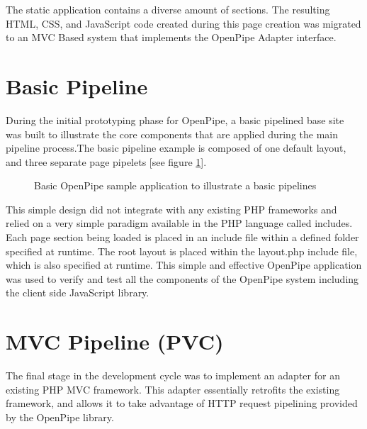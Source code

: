 \documentclass[12pt]{report}
\begin{document}
The static application contains a diverse amount of sections. The resulting HTML, CSS, and JavaScript code created during this page creation was migrated to an MVC Based system that implements the OpenPipe Adapter interface.


\section{Basic Pipeline}
During the initial prototyping phase for OpenPipe, a basic pipelined base site was built to illustrate the core components that are applied during the main pipeline process.The basic pipeline example is composed of one default layout, and three separate page pipelets [see figure \ref{fig:basicPipeline}]. 

\begin{figure}[H]
\centering
{}
\caption{Basic OpenPipe sample application to illustrate a basic pipelines}
\label{fig:basicPipeline}
\end{figure}

This simple design did not integrate with any existing PHP frameworks and relied on a very simple paradigm available in the PHP language called includes. Each page section being loaded is placed in an include file within a defined folder specified at runtime. The root layout is placed within the layout.php include file, which is also specified at runtime. This simple and effective OpenPipe application was used to verify and test all the components of the OpenPipe system including the client side JavaScript library. 


\section{MVC Pipeline (PVC)}
The final stage in the development cycle was to implement an adapter for an existing PHP MVC framework. This adapter essentially retrofits the existing framework, and allows it to take advantage of HTTP request pipelining provided by the OpenPipe library. 
\end{document}
